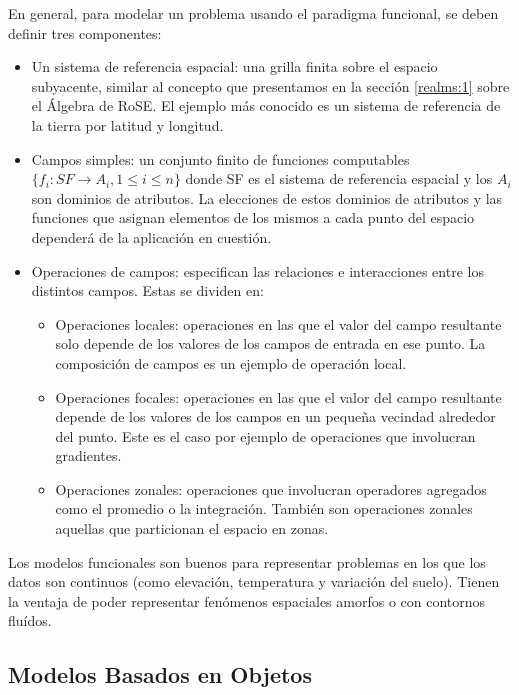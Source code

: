 En general, para modelar un problema usando el paradigma funcional, se deben definir tres componentes\textsuperscript{\cite{worboyz}}:
\begin{itemize}
    \item Un sistema de referencia espacial: una grilla finita sobre el espacio subyacente,
    similar al concepto que presentamos en la sección \ref{realms:1} sobre el Álgebra de RoSE.
    El ejemplo más conocido es un sistema de referencia de la tierra por latitud y longitud.
    \item Campos simples: un conjunto finito de funciones computables $\{f_i: SF \rightarrow A_i, 1 \le i \le n\}$
    donde SF es el sistema de referencia espacial y los $A_i$ son dominios de atributos. La elecciones de estos dominios de atributos
    y las funciones que asignan elementos de los mismos a cada punto del espacio dependerá de la aplicación en cuestión.
    \item Operaciones de campos: especifican las relaciones e interacciones entre los distintos campos. Estas se dividen en:
    \begin{itemize}
        \item Operaciones locales: operaciones en las que el valor del campo resultante solo depende de los valores de los campos de entrada en ese punto.
        La composición de campos es un ejemplo de operación local.
        \item Operaciones focales: operaciones en las que el valor del campo resultante depende de los valores de los campos en un pequeña vecindad alrededor del punto.
        Este es el caso por ejemplo de operaciones que involucran gradientes.
        \item Operaciones zonales: operaciones que involucran operadores agregados como el promedio o la integración. También son operaciones
        zonales aquellas que particionan el espacio en zonas.
    \end{itemize}
\end{itemize}

Los modelos funcionales son buenos para representar problemas en los que los datos son continuos (como elevación, temperatura y variación del suelo). Tienen la ventaja de poder representar fenómenos espaciales amorfos o con contornos fluídos.

\subsection{Modelos Basados en Objetos} \label{sec:s:obj}

